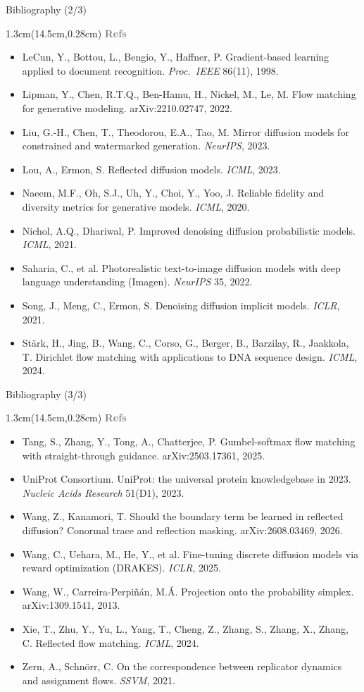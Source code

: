 \documentclass[aspectratio=169,10pt]{beamer}
\newcommand{\lab}[1]{%
  \begin{textblock*}{1.3cm}(14.5cm,0.28cm)
    \raggedleft\bfseries\small\textcolor{gray}{#1}
  \end{textblock*}}
\begin{document}
\begin{frame}{Bibliography (2/3)}
\lab{Refs}
\footnotesize
\begin{itemize}\itemsep1pt
\item LeCun, Y., Bottou, L., Bengio, Y., Haffner, P. Gradient-based learning applied to document
recognition. \emph{Proc.\ IEEE} 86(11), 1998.
\item Lipman, Y., Chen, R.T.Q., Ben-Hamu, H., Nickel, M., Le, M. Flow matching for generative
modeling. arXiv:2210.02747, 2022.
\item Liu, G.-H., Chen, T., Theodorou, E.A., Tao, M. Mirror diffusion models for constrained and
watermarked generation. \emph{NeurIPS}, 2023.
\item Lou, A., Ermon, S. Reflected diffusion models. \emph{ICML}, 2023.
\item Naeem, M.F., Oh, S.J., Uh, Y., Choi, Y., Yoo, J. Reliable fidelity and diversity metrics
for generative models. \emph{ICML}, 2020.
\item Nichol, A.Q., Dhariwal, P. Improved denoising diffusion probabilistic models. \emph{ICML},
2021.
\item Saharia, C., et al. Photorealistic text-to-image diffusion models with deep language
understanding (Imagen). \emph{NeurIPS} 35, 2022.
\item Song, J., Meng, C., Ermon, S. Denoising diffusion implicit models. \emph{ICLR}, 2021.
\item St\"ark, H., Jing, B., Wang, C., Corso, G., Berger, B., Barzilay, R., Jaakkola, T.
Dirichlet flow matching with applications to DNA sequence design. \emph{ICML}, 2024.
\end{itemize}
\end{frame}

\begin{frame}{Bibliography (3/3)}
\lab{Refs}
\footnotesize
\begin{itemize}\itemsep1pt
\item Tang, S., Zhang, Y., Tong, A., Chatterjee, P. Gumbel-softmax flow matching with
straight-through guidance. arXiv:2503.17361, 2025.
\item UniProt Consortium. UniProt: the universal protein knowledgebase in 2023. \emph{Nucleic
Acids Research} 51(D1), 2023.
\item Wang, Z., Kanamori, T. Should the boundary term be learned in reflected diffusion? Conormal
trace and reflection masking. arXiv:2608.03469, 2026.
\item Wang, C., Uehara, M., He, Y., et al. Fine-tuning discrete diffusion models via reward
optimization (DRAKES). \emph{ICLR}, 2025.
\item Wang, W., Carreira-Perpi\~n\'an, M.\'A. Projection onto the probability simplex.
arXiv:1309.1541, 2013.
\item Xie, T., Zhu, Y., Yu, L., Yang, T., Cheng, Z., Zhang, S., Zhang, X., Zhang, C. Reflected flow
matching. \emph{ICML}, 2024.
\item Zern, A., Schn\"orr, C. On the correspondence between replicator dynamics and assignment
flows. \emph{SSVM}, 2021.
\end{itemize}
\end{frame}
\end{document}
